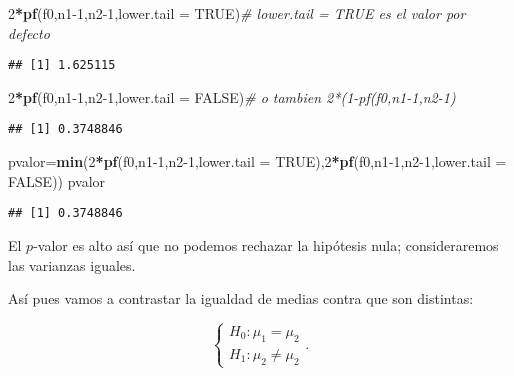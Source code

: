 \documentclass[
]{article}
\newenvironment{Shaded}{\begin{snugshade}}{\end{snugshade}}
\newcommand{\CommentTok}[1]{\textcolor[rgb]{0.56,0.35,0.01}{\textit{#1}}}
\newcommand{\DataTypeTok}[1]{\textcolor[rgb]{0.13,0.29,0.53}{#1}}
\newcommand{\DecValTok}[1]{\textcolor[rgb]{0.00,0.00,0.81}{#1}}
\newcommand{\KeywordTok}[1]{\textcolor[rgb]{0.13,0.29,0.53}{\textbf{#1}}}
\newcommand{\NormalTok}[1]{#1}
\newcommand{\OperatorTok}[1]{\textcolor[rgb]{0.81,0.36,0.00}{\textbf{#1}}}
\newcommand{\OtherTok}[1]{\textcolor[rgb]{0.56,0.35,0.01}{#1}}
\begin{document}
\begin{Shaded}
\begin{Highlighting}[]
\DecValTok{2}\OperatorTok{*}\KeywordTok{pf}\NormalTok{(f0,n1}\DecValTok{-1}\NormalTok{,n2}\DecValTok{-1}\NormalTok{,}\DataTypeTok{lower.tail =} \OtherTok{TRUE}\NormalTok{)}\CommentTok{# lower.tail = TRUE es el valor por defecto }
\end{Highlighting}
\end{Shaded}

\begin{verbatim}
## [1] 1.625115
\end{verbatim}

\begin{Shaded}
\begin{Highlighting}[]
\DecValTok{2}\OperatorTok{*}\KeywordTok{pf}\NormalTok{(f0,n1}\DecValTok{-1}\NormalTok{,n2}\DecValTok{-1}\NormalTok{,}\DataTypeTok{lower.tail =} \OtherTok{FALSE}\NormalTok{)}\CommentTok{# o tambien 2*(1-pf(f0,n1-1,n2-1)  }
\end{Highlighting}
\end{Shaded}

\begin{verbatim}
## [1] 0.3748846
\end{verbatim}

\begin{Shaded}
\begin{Highlighting}[]
\NormalTok{pvalor=}\KeywordTok{min}\NormalTok{(}\DecValTok{2}\OperatorTok{*}\KeywordTok{pf}\NormalTok{(f0,n1}\DecValTok{-1}\NormalTok{,n2}\DecValTok{-1}\NormalTok{,}\DataTypeTok{lower.tail =} \OtherTok{TRUE}\NormalTok{),}\DecValTok{2}\OperatorTok{*}\KeywordTok{pf}\NormalTok{(f0,n1}\DecValTok{-1}\NormalTok{,n2}\DecValTok{-1}\NormalTok{,}\DataTypeTok{lower.tail =} \OtherTok{FALSE}\NormalTok{))}
\NormalTok{pvalor}
\end{Highlighting}
\end{Shaded}

\begin{verbatim}
## [1] 0.3748846
\end{verbatim}

El \(p\)-valor es alto así que no podemos rechazar la hipótesis nula;
consideraremos las varianzas iguales.

Así pues vamos a contrastar la igualdad de medias contra que son
distintas:

\[
\left\{
\begin{array}{ll}
H_{0}:\mu_1=\mu_2\\
H_{1}:\mu_2\not= \mu_2 
\end{array}
\right..
\]
\end{document}
